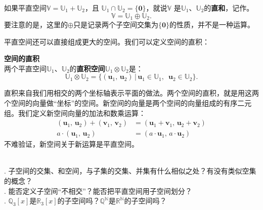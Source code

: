 \documentclass[12pt,UTF8]{ctexbook}
\begin{document}
如果平直空间$\mathbb{V} = \mathbb{U}_1 + \mathbb{U}_2$，且
$\mathbb{U}_1 \cap \mathbb{U}_2 = \{\mathbf{0}\}$，就说$\mathbb{V}$
是$\mathbb{U}_1$、$\mathbb{U}_2$的\textbf{直和}，记作。
$$\mathbb{V} = \mathbb{U}_1 \oplus \mathbb{U}_2.$$
要注意的是，这里的$\oplus$只是记录两个子空间交集为$\{\mathbf{0}\}$的性质，并不是一种运算。

平直空间还可以直接组成更大的空间。我们可以定义空间的直积：

\begin{df}{\textbf{空间的直积}}
    \mbox{} \\
    两个平直空间$\mathbb{U}_1$、$\mathbb{U}_2$的\textbf{直积空间}$\mathbb{U}_1 \otimes \mathbb{U}_2$是：
    $$ \mathbb{U}_1 \otimes \mathbb{U}_2 = \{ (\mathbf{u}_1, \, \mathbf{u}_2) \,|\, \mathbf{u}_1 \in \mathbb{U}_1,\,\,\, \mathbf{u}_2 \in \mathbb{U}_2\}.$$
\end{df}

直积来自我们用相交的两个坐标轴表示平面的做法。两个空间的直积，就是用这两个空间的向量做“坐标”的空间。新空间的向量是两个空间的向量组成的有序二元组。我们定义新空间向量的加法和数乘运算：
\begin{align*}
    (\mathbf{u}_1, \, \mathbf{u}_2) + (\mathbf{v}_1, \, \mathbf{v}_2) &= (\mathbf{u}_1 + \mathbf{v}_1, \, \mathbf{u}_2 + \mathbf{v}_2) \\
    a \cdot (\mathbf{u}_1, \, \mathbf{u}_2) &= (a\cdot \mathbf{u}_1, \, a \cdot \mathbf{u}_2) 
\end{align*}
不难验证，新空间关于新运算是平直空间。

\begin{sk}
    \mbox{} \\
    . 子空间的交集、和空间，与子集的交集、并集有什么相似之处？有没有类似空集的概念？\\
    . 能否定义子空间“不相交”？能否把平直空间用子空间划分？\\
    . $\mathbb{Q}_3[x]$是$\mathbb{R}_3[x]$的子空间吗？$\mathbb{Q}^\mathbb{N}$是$\mathbb{R}^\mathbb{N}$的子空间吗？
\end{sk}
\end{document}
